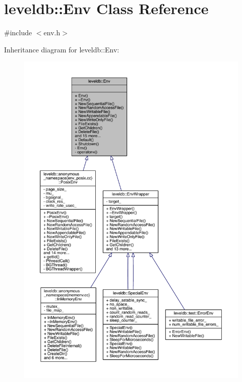 \hypertarget{classleveldb_1_1_env}{}\section{leveldb\+:\+:Env Class Reference}
\label{classleveldb_1_1_env}


{\ttfamily \#include $<$env.\+h$>$}



Inheritance diagram for leveldb\+:\+:Env\+:
\nopagebreak
\begin{figure}[H]
\begin{center}
\leavevmode
\includegraphics[width=350pt]{classleveldb_1_1_env__inherit__graph}
\end{center}
\end{figure}



